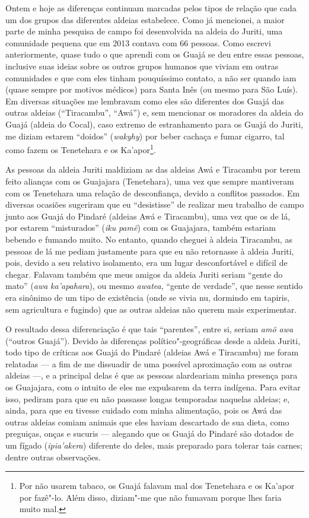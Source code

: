 Ontem e hoje as diferenças continuam marcadas pelos tipos de relação que
cada um dos grupos das diferentes aldeias estabelece. Como já mencionei,
a maior parte de minha pesquisa de campo foi desenvolvida na aldeia do
 Juriti, uma comunidade pequena que em 2013 contava com 66 pessoas.
Como escrevi anteriormente, quase tudo o que aprendi com os Guajá se deu
entre essas pessoas, inclusive suas ideias sobre os outros grupos
humanos que viviam em outras comunidades e que com eles tinham
pouquíssimo contato, a não ser quando iam (quase sempre por motivos
médicos) para Santa Inês (ou mesmo para São Luís). Em diversas situações
me lembravam como eles são diferentes dos Guajá das outras aldeias
(``Tiracambu'', ``Awá'') e, sem mencionar os moradores da aldeia do 
Guajá (aldeia do Cocal), caso extremo de estranhamento para os Guajá do
Juriti, me diziam estarem ``doidos'' (\emph{wakyhy}) por beber cachaça e
fumar cigarro, tal como fazem os Tenetehara e os Ka'apor\footnote{Por
  não usarem tabaco, os Guajá falavam mal dos Tenetehara e os Ka'apor
  por fazê"-lo. Além disso, diziam"-me que não fumavam porque lhes faria
  muito mal.}.

As pessoas da aldeia Juriti maldiziam as das aldeias Awá e Tiracambu por
terem feito alianças com os Guajajara (Tenetehara), uma vez que sempre
mantiveram com os Tenetehara uma relação de desconfiança, devido a
conflitos passados. Em diversas ocasiões sugeriram que eu ``desistisse''
de realizar meu trabalho de campo junto aos Guajá do Pindaré (aldeias
Awá e Tiracambu), uma vez que os de lá, por estarem ``misturados''
(\emph{iku} \emph{pamẽ}) com os Guajajara, também estariam bebendo e
fumando muito. No entanto, quando cheguei à aldeia Tiracambu, as pessoas
de lá me pediam justamente para que eu não retornasse à aldeia Juriti,
pois, devido a seu relativo isolamento, era um lugar desconfortável e
difícil de chegar. Falavam também que meus amigos da aldeia Juriti
seriam ``gente do mato'' (\emph{awa} \emph{ka'apahara}), ou mesmo
\emph{awatea}, ``gente de verdade'', que nesse sentido era sinônimo de um
tipo de existência (onde se vivia nu, dormindo em tapiris, sem
agricultura e fugindo) que as outras aldeias não querem mais
experimentar.

O resultado dessa diferenciação é que tais ``parentes'', entre si, seriam
\emph{amõ awa} (``outros Guajá''). Devido às diferenças
político"-geográficas desde a aldeia Juriti, todo tipo de críticas aos
Guajá do Pindaré (aldeias Awá e Tiracambu) me foram relatadas --- a fim de
me dissuadir de uma possível aproximação com as outras aldeias ---, e a
principal delas é que as pessoas alardeariam minha presença para os
Guajajara, com o intuito de eles me expulsarem da terra indígena. Para
evitar isso, pediram para que eu não passasse longas temporadas naquelas
aldeias; e, ainda, para que eu tivesse cuidado com minha alimentação,
pois os Awá das outras aldeias comiam animais que eles haviam descartado
de sua dieta, como preguiças, onças e sucuris --- alegando que os Guajá do
Pindaré são dotados de um fígado (\emph{ipia'akera}) diferente do deles,
mais preparado para tolerar tais carnes; dentre outras observações.


